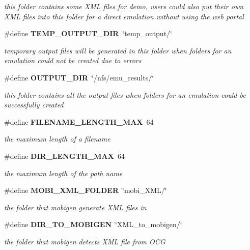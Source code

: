 \begin{CompactItemize}
\begin{CompactList}\small\item\em this folder contains some XML files for demo, users could also put their own XML files into this folder for a direct emulation without using the web portal \item\end{CompactList}\item 
\#define {\bf TEMP\_\-OUTPUT\_\-DIR}~\char`\"{}temp\_\-output/\char`\"{}
\begin{CompactList}\small\item\em temporary output files will be generated in this folder when folders for an emulation could not be created due to errors \item\end{CompactList}\item 
\#define {\bf OUTPUT\_\-DIR}~\char`\"{}/nfs/emu\_\-results/\char`\"{}
\begin{CompactList}\small\item\em this folder contains all the output files when folders for an emulation could be successfully created \item\end{CompactList}\item 
\#define {\bf FILENAME\_\-LENGTH\_\-MAX}~64
\begin{CompactList}\small\item\em the maximum length of a filename \item\end{CompactList}\item 
\#define {\bf DIR\_\-LENGTH\_\-MAX}~64
\begin{CompactList}\small\item\em the maximum length of the path name \item\end{CompactList}\item 
\#define {\bf MOBI\_\-XML\_\-FOLDER}~\char`\"{}mobi\_\-XML/\char`\"{}
\begin{CompactList}\small\item\em the folder that mobigen generate XML files in \item\end{CompactList}\item 
\#define {\bf DIR\_\-TO\_\-MOBIGEN}~\char`\"{}XML\_\-to\_\-mobigen/\char`\"{}
\begin{CompactList}\small\item\em the folder that mobigen detects XML file from OCG \item\end{CompactList}\end{CompactItemize}
